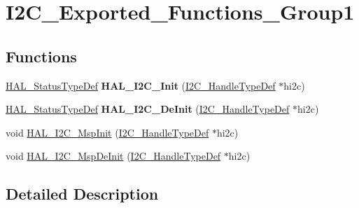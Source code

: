 \hypertarget{group___i2_c___exported___functions___group1}{\section{I2\-C\-\_\-\-Exported\-\_\-\-Functions\-\_\-\-Group1}
\label{group___i2_c___exported___functions___group1}
}
\subsection*{Functions}
\begin{DoxyCompactItemize}
\item 
\hypertarget{group___i2_c___exported___functions___group1_ga9d29159a6da072287fff73743fd93260}{\hyperlink{stm32l1xx__hal__def_8h_a63c0679d1cb8b8c684fbb0632743478f}{H\-A\-L\-\_\-\-Status\-Type\-Def} {\bfseries H\-A\-L\-\_\-\-I2\-C\-\_\-\-Init} (\hyperlink{struct_i2_c___handle_type_def}{I2\-C\-\_\-\-Handle\-Type\-Def} $\ast$hi2c)}\label{group___i2_c___exported___functions___group1_ga9d29159a6da072287fff73743fd93260}

\item 
\hypertarget{group___i2_c___exported___functions___group1_gabda634ba18f874775d1262c887d273b4}{\hyperlink{stm32l1xx__hal__def_8h_a63c0679d1cb8b8c684fbb0632743478f}{H\-A\-L\-\_\-\-Status\-Type\-Def} {\bfseries H\-A\-L\-\_\-\-I2\-C\-\_\-\-De\-Init} (\hyperlink{struct_i2_c___handle_type_def}{I2\-C\-\_\-\-Handle\-Type\-Def} $\ast$hi2c)}\label{group___i2_c___exported___functions___group1_gabda634ba18f874775d1262c887d273b4}

\item 
void \hyperlink{group___i2_c___exported___functions___group1_gabe01a202c27b23fc150aa66af3130073}{H\-A\-L\-\_\-\-I2\-C\-\_\-\-Msp\-Init} (\hyperlink{struct_i2_c___handle_type_def}{I2\-C\-\_\-\-Handle\-Type\-Def} $\ast$hi2c)
\item 
void \hyperlink{group___i2_c___exported___functions___group1_ga2ec8d9b09854c732e2feed549278f048}{H\-A\-L\-\_\-\-I2\-C\-\_\-\-Msp\-De\-Init} (\hyperlink{struct_i2_c___handle_type_def}{I2\-C\-\_\-\-Handle\-Type\-Def} $\ast$hi2c)
\end{DoxyCompactItemize}


\subsection{Detailed Description}


